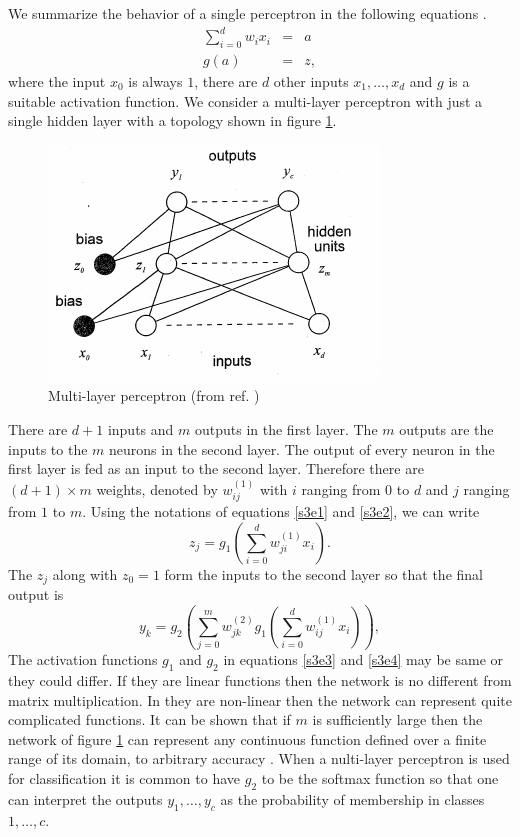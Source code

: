 \documentclass{article}
\numberwithin{equation}{section}
\begin{document}
We summarize the behavior of a single perceptron in the following
equations \cite{bishop1994neural}.
\begin{eqnarray}
\sum_{i=0}^d w_i x_i &=& a \label{s3e1} \\
g(a) &=& z \label{s3e2},
\end{eqnarray}
where the input $x_0$ is always $1$, there are $d$ other inputs $x_1, 
\ldots, x_d$ and $g$ is a suitable activation function. We consider a
multi-layer perceptron with just a single hidden layer with a topology
shown in figure \ref{f4}.
\begin{figure}[!ht]
\centering
\includegraphics[scale=0.8]{mlp}
\caption{Multi-layer perceptron (from ref. \cite{bishop1994neural})}
\label{f4}
\end{figure}
There are $d + 1$ inputs and $m$ outputs in the first layer. The $m$ 
outputs are the inputs to the $m$ neurons in the second layer. The output
of every neuron in the first layer is fed as an input to the second layer.
Therefore there are $(d + 1) \times m$ weights, denoted by $w_{ij}^{(1)}$ with
$i$ ranging from $0$ to $d$ and $j$ ranging from $1$ to $m$. Using the 
notations of equations \eqref{s3e1} and \eqref{s3e2}, we can write
\begin{equation}\label{s3e3}
z_j = g_1\left(\sum_{i=0}^d w_{ji}^{(1)}x_i\right).
\end{equation}
The $z_j$ along with $z_0 = 1$ form the inputs to the second layer so that 
the final output is
\begin{equation}\label{s3e4}
y_k = g_2\left(\sum_{j=0}^m w^{(2)}_{jk} g_1\left(\sum_{i=0}^d w^{(1)}_{ij}x_i
\right)\right),
\end{equation}
The activation functions $g_1$ and $g_2$ in equations \eqref{s3e3} and 
\eqref{s3e4} may be same or they could differ. If they are linear functions
then the network is no different from matrix multiplication. In they are
non-linear then the network can represent quite complicated functions. It can
be shown that if $m$ is sufficiently large then the network of figure \ref{f4}
can represent any continuous function defined over a finite range of its
domain, to arbitrary accuracy \cite{bishop1994neural}. When a nulti-layer
perceptron is used for classification it is common to have $g_2$ to be the
softmax function so that one can interpret the outputs $y_1, \ldots, y_c$ as
the probability of membership in classes $1, \ldots, c$.
\end{document}
